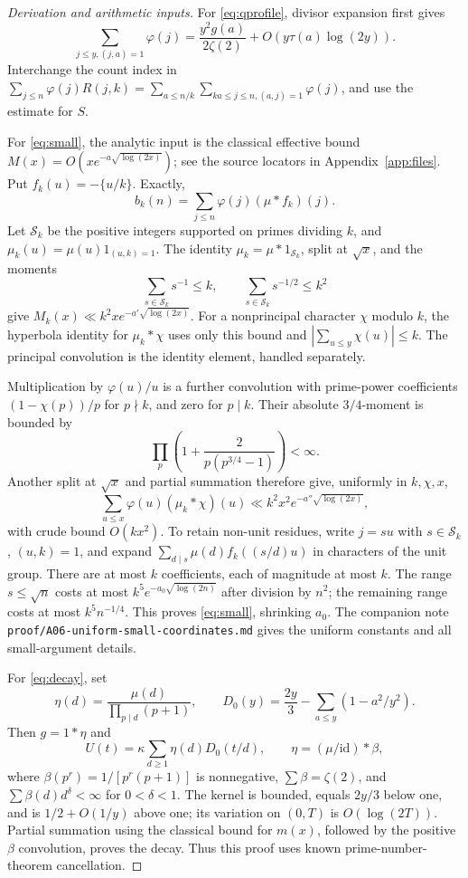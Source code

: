 \documentclass[11pt]{article}
\theoremstyle{remark}\newtheorem{remark}[theorem]{Remark}
\begin{document}
\begin{proof}[Derivation and arithmetic inputs]
For \eqref{eq:qprofile}, divisor expansion first gives
\[
 \sum_{j\le y,(j,a)=1}\varphi(j)
 =\frac{y^2g(a)}{2\zeta(2)}+O(y\tau(a)\log(2y)).
\]
Interchange the count index in
$\sum_{j\le n}\varphi(j)R(j,k)=\sum_{a\le n/k}\sum_{ka\le j\le n,(a,j)=1}\varphi(j)$,
and use the estimate for $S$.

For \eqref{eq:small}, the analytic input is the classical effective bound
$M(x)=O(xe^{-a\sqrt{\log(2x)}})$; see the source locators in Appendix~\ref{app:files}. Put $f_k(u)=-\{u/k\}$. Exactly,
\[
 b_k(n)=\sum_{j\le n}\varphi(j)(\mu*f_k)(j).
\]
Let $\mathcal S_k$ be the positive integers supported on primes dividing $k$, and $\mu_k(u)=\mu(u)1_{(u,k)=1}$. The identity $\mu_k=\mu*1_{\mathcal S_k}$, split at $\sqrt x$, and the moments
\[
 \sum_{s\in\mathcal S_k}s^{-1}\le k,\qquad
 \sum_{s\in\mathcal S_k}s^{-1/2}\le k^2
\]
give $M_k(x)\ll k^2x e^{-a'\sqrt{\log(2x)}}$. For a nonprincipal character $\chi$ modulo $k$, the hyperbola identity for $\mu_k*\chi$ uses only this bound and $|\sum_{u\le y}\chi(u)|\le k$. The principal convolution is the identity element, handled separately.

Multiplication by $\varphi(u)/u$ is a further convolution with prime-power coefficients $(1-\chi(p))/p$ for $p\nmid k$, and zero for $p\mid k$. Their absolute $3/4$-moment is bounded by
\[
 \prod_p\left(1+\frac2{p(p^{3/4}-1)}\right)<\infty.
\]
Another split at $\sqrt x$ and partial summation therefore give, uniformly in $k,\chi,x$,
\[
 \sum_{u\le x}\varphi(u)(\mu_k*\chi)(u)
 \ll k^2x^2e^{-a''\sqrt{\log(2x)}},
\]
with crude bound $O(kx^2)$. To retain non-unit residues, write $j=su$ with $s\in\mathcal S_k$, $(u,k)=1$, and expand
$\sum_{d\mid s}\mu(d)f_k((s/d)u)$ in characters of the unit group. There are at most $k$ coefficients, each of magnitude at most $k$. The range $s\le\sqrt n$ costs at most $k^5e^{-a_0\sqrt{\log(2n)}}$ after division by $n^2$; the remaining range costs at most $k^5n^{-1/4}$. This proves \eqref{eq:small}, shrinking $a_0$. The companion note \texttt{proof/A06-uniform-small-coordinates.md} gives the uniform constants and all small-argument details.

For \eqref{eq:decay}, set
\[
 \eta(d)=\frac{\mu(d)}{\prod_{p\mid d}(p+1)},\qquad
 D_0(y)=\frac{2y}3-\sum_{a\le y}(1-a^2/y^2).
\]
Then $g=1*\eta$ and
\begin{equation}\label{eq:kernel}
 U(t)=\kappa\sum_{d\ge1}\eta(d)D_0(t/d),\qquad
 \eta=(\mu/\mathrm{id})*\beta,
\end{equation}
where $\beta(p^r)=1/[p^r(p+1)]$ is nonnegative, $\sum\beta=\zeta(2)$, and $\sum\beta(d)d^\delta<\infty$ for $0<\delta<1$. The kernel is bounded, equals $2y/3$ below one, and is $1/2+O(1/y)$ above one; its variation on $(0,T)$ is $O(\log(2T))$. Partial summation using the classical bound for $m(x)$, followed by the positive $\beta$ convolution, proves the decay. Thus this proof uses known prime-number-theorem cancellation.


\end{proof}
\end{document}
